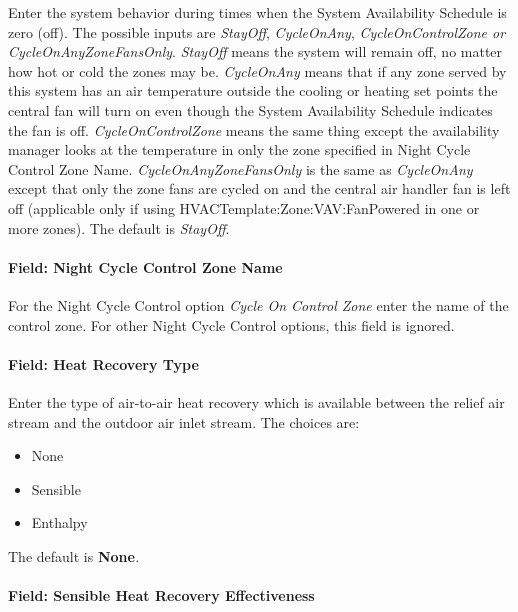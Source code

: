 Enter the system behavior during times when the System Availability Schedule is zero (off). The possible inputs are \emph{StayOff}, \emph{CycleOnAny}, \emph{CycleOnControlZone or CycleOnAnyZoneFansOnly}. \emph{StayOff} means the system will remain off, no matter how hot or cold the zones may be. \emph{CycleOnAny} means that if any zone served by this system has an air temperature outside the cooling or heating set points the central fan will turn on even though the System Availability Schedule indicates the fan is off. \emph{CycleOnControlZone} means the same thing except the availability manager looks at the temperature in only the zone specified in Night Cycle Control Zone Name. \emph{CycleOnAnyZoneFansOnly} is the same as \emph{CycleOnAny} except that only the zone fans are cycled on and the central air handler fan is left off (applicable only if using HVACTemplate:Zone:VAV:FanPowered in one or more zones). The default is \emph{StayOff}.

\paragraph{Field: Night Cycle Control Zone Name}\label{field-night-cycle-control-zone-name-4}

For the Night Cycle Control option \emph{Cycle On Control Zone} enter the name of the control zone. For other Night Cycle Control options, this field is ignored.

\paragraph{Field: Heat Recovery Type}\label{field-heat-recovery-type-6}

Enter the type of air-to-air heat recovery which is available between the relief air stream and the outdoor air inlet stream. The choices are:

\begin{itemize}
\item
  None
\item
  Sensible
\item
  Enthalpy
\end{itemize}

The default is \textbf{None}\emph{.}

\paragraph{Field: Sensible Heat Recovery Effectiveness}\label{field-sensible-heat-recovery-effectiveness-6}

